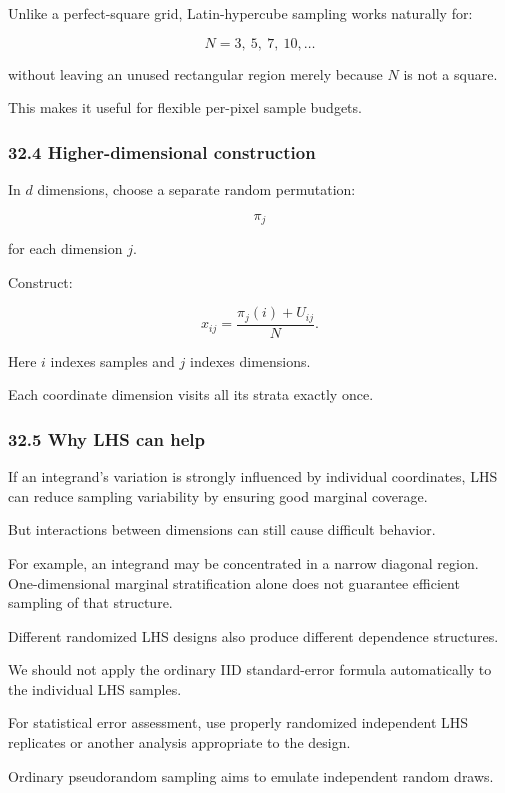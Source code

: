 Unlike a perfect-square grid, Latin-hypercube sampling works naturally for:

\[ N=3,\ 5,\ 7,\ 10,\ldots \]

without leaving an unused rectangular region merely because \(N\) is not a square.

This makes it useful for flexible per-pixel sample budgets.

\subsubsection{32.4 Higher-dimensional construction}\label{higher-dimensional-construction}

In \(d\) dimensions, choose a separate random permutation:

\[ \pi_j \]

for each dimension \(j\).

Construct:

\[ \boxed{ x_{ij}= \frac{\pi_j(i)+U_{ij}}N }. \]

Here \(i\) indexes samples and \(j\) indexes dimensions.

Each coordinate dimension visits all its strata exactly once.

\subsubsection{32.5 Why LHS can help}\label{why-lhs-can-help}

If an integrand's variation is strongly influenced by individual coordinates, LHS can reduce sampling variability by ensuring good marginal coverage.

But interactions between dimensions can still cause difficult behavior.

For example, an integrand may be concentrated in a narrow diagonal region. One-dimensional marginal stratification alone does not guarantee efficient sampling of that structure.

Different randomized LHS designs also produce different dependence structures.

We should not apply the ordinary IID standard-error formula automatically to the individual LHS samples.

For statistical error assessment, use properly randomized independent LHS replicates or another analysis appropriate to the design.

Ordinary pseudorandom sampling aims to emulate independent random draws.

